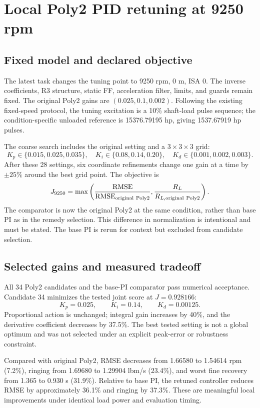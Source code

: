 \chapter{Local Poly2 PID retuning at 9250 rpm}
\section{Fixed model and declared objective}
The latest task changes the tuning point to 9250 rpm, 0 m, ISA 0. The inverse coefficients, R3 structure, static FF, acceleration filter, limits, and guards remain fixed. The original Poly2 gains are $(0.025,0.1,0.002)$. Following the existing fixed-speed protocol, the tuning excitation is a 10\% shaft-load pulse sequence; the condition-specific unloaded reference is 15376.79195 hp, giving 1537.67919 hp pulses.

The coarse search includes the original setting and a $3\times3\times3$ grid:
\begin{equation}
K_p\in\{0.015,0.025,0.035\},\quad
K_i\in\{0.08,0.14,0.20\},\quad
K_d\in\{0.001,0.002,0.003\}.
\end{equation}
After these 28 settings, six coordinate refinements change one gain at a time by $\pm25\%$ around the best grid point. The objective is
\begin{equation}
J_{9250}=\max\left(\frac{\operatorname{RMSE}}{\operatorname{RMSE}_{\rm original\ Poly2}},
\frac{R_L}{R_{L,\rm original\ Poly2}}\right).
\end{equation}
The comparator is now the original Poly2 at the same condition, rather than base PI as in the remedy selection. This difference in normalization is intentional and must be stated. The base PI is rerun for context but excluded from candidate selection.

\section{Selected gains and measured tradeoff}
All 34 Poly2 candidates and the base-PI comparator pass numerical acceptance. Candidate 34 minimizes the tested joint score at $J=0.928166$:
\begin{equation}
\boxed{K_p=0.025,\qquad K_i=0.14,\qquad K_d=0.00125.}
\end{equation}
Proportional action is unchanged; integral gain increases by 40\%, and the derivative coefficient decreases by 37.5\%. The best tested setting is not a global optimum and was not selected under an explicit peak-error or robustness constraint.


Compared with original Poly2, RMSE decreases from 1.66580 to 1.54614 rpm (7.2\%), ringing from 1.69680 to 1.29904 lbm/s (23.4\%), and worst fine recovery from 1.365 to 0.930 s (31.9\%). Relative to base PI, the retuned controller reduces RMSE by approximately 36.1\% and ringing by 37.3\%. These are meaningful local improvements under identical load power and evaluation timing.

